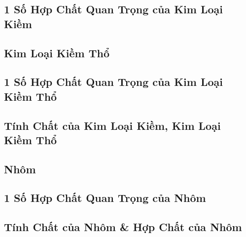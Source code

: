 \documentclass{article}
\numberwithin{equation}{section}
\begin{document}

\subsection{1 Số Hợp Chất Quan Trọng của Kim Loại Kiềm}


\subsection{Kim Loại Kiềm Thổ}


\subsection{1 Số Hợp Chất Quan Trọng của Kim Loại Kiềm Thổ}


\subsection{Tính Chất của Kim Loại Kiềm, Kim Loại Kiềm Thổ}


\subsection{Nhôm}


\subsection{1 Số Hợp Chất Quan Trọng của Nhôm}


\subsection{Tính Chất của Nhôm \& Hợp Chất của Nhôm}

\end{document}
